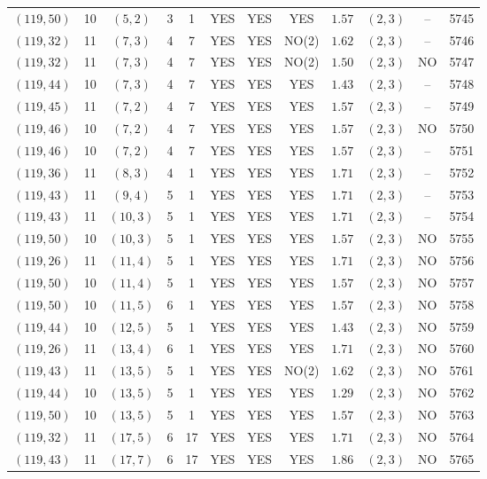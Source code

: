 \begin{longtable}{|c|c|c|c|c|c|c|c|c|c|c|c|}
$(119,50)$ & 10 & $(5,2)$ & 3 & 1 & YES & YES & YES & $1.57$ & $(2,3)$ & -- & 5745\\
$(119,32)$ & 11 & $(7,3)$ & 4 & 7 & YES & YES & NO(2) & $1.62$ & $(2,3)$ & -- & 5746\\
$(119,32)$ & 11 & $(7,3)$ & 4 & 7 & YES & YES & NO(2) & $1.50$ & $(2,3)$ & NO & 5747\\
$(119,44)$ & 10 & $(7,3)$ & 4 & 7 & YES & YES & YES & $1.43$ & $(2,3)$ & -- & 5748\\
$(119,45)$ & 11 & $(7,2)$ & 4 & 7 & YES & YES & YES & $1.57$ & $(2,3)$ & -- & 5749\\
$(119,46)$ & 10 & $(7,2)$ & 4 & 7 & YES & YES & YES & $1.57$ & $(2,3)$ & NO & 5750\\
$(119,46)$ & 10 & $(7,2)$ & 4 & 7 & YES & YES & YES & $1.57$ & $(2,3)$ & -- & 5751\\
$(119,36)$ & 11 & $(8,3)$ & 4 & 1 & YES & YES & YES & $1.71$ & $(2,3)$ & -- & 5752\\
$(119,43)$ & 11 & $(9,4)$ & 5 & 1 & YES & YES & YES & $1.71$ & $(2,3)$ & -- & 5753\\
$(119,43)$ & 11 & $(10,3)$ & 5 & 1 & YES & YES & YES & $1.71$ & $(2,3)$ & -- & 5754\\
$(119,50)$ & 10 & $(10,3)$ & 5 & 1 & YES & YES & YES & $1.57$ & $(2,3)$ & NO & 5755\\
$(119,26)$ & 11 & $(11,4)$ & 5 & 1 & YES & YES & YES & $1.71$ & $(2,3)$ & NO & 5756\\
$(119,50)$ & 10 & $(11,4)$ & 5 & 1 & YES & YES & YES & $1.57$ & $(2,3)$ & NO & 5757\\
$(119,50)$ & 10 & $(11,5)$ & 6 & 1 & YES & YES & YES & $1.57$ & $(2,3)$ & NO & 5758\\
$(119,44)$ & 10 & $(12,5)$ & 5 & 1 & YES & YES & YES & $1.43$ & $(2,3)$ & NO & 5759\\
$(119,26)$ & 11 & $(13,4)$ & 6 & 1 & YES & YES & YES & $1.71$ & $(2,3)$ & NO & 5760\\
$(119,43)$ & 11 & $(13,5)$ & 5 & 1 & YES & YES & NO(2) & $1.62$ & $(2,3)$ & NO & 5761\\
$(119,44)$ & 10 & $(13,5)$ & 5 & 1 & YES & YES & YES & $1.29$ & $(2,3)$ & NO & 5762\\
$(119,50)$ & 10 & $(13,5)$ & 5 & 1 & YES & YES & YES & $1.57$ & $(2,3)$ & NO & 5763\\
$(119,32)$ & 11 & $(17,5)$ & 6 & 17 & YES & YES & YES & $1.71$ & $(2,3)$ & NO & 5764\\
$(119,43)$ & 11 & $(17,7)$ & 6 & 17 & YES & YES & YES & $1.86$ & $(2,3)$ & NO & 5765\\

\end{longtable}
